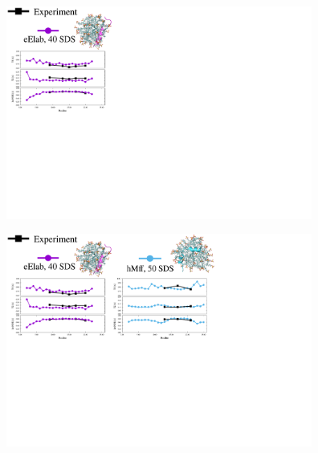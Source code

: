 \documentclass{beamer}
\begin{document}
\begin{frame}
\begin{center}


\vspace{0.5cm}


\includegraphics[height=7cm]{all_pep8.pdf}
\end{center}
\end{frame}




\addtocounter{framenumber}{-1}
\begin{frame}
\begin{center}


\vspace{0.5cm}


\includegraphics[height=7cm]{all_pep7.pdf}
\end{center}
\end{frame}
\end{document}

